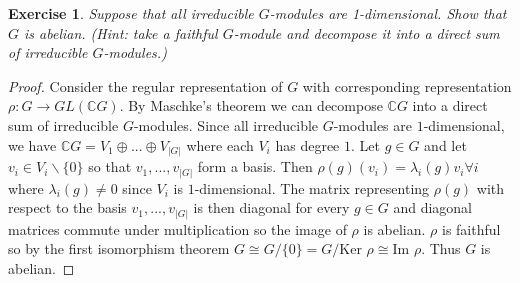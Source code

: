 \documentclass{article}
\newtheorem{exercise}[theorem]{Exercise}
\begin{document}
\begin{exercise} Suppose that all irreducible $G$-modules are 1-dimensional. Show that $G$ is abelian. (\textit{Hint: take a faithful $G$-module and decompose it into a direct sum of irreducible $G$-modules.})
\end{exercise}
\begin{proof}
Consider the regular representation of $G$ with corresponding representation $\rho:G\to GL(\mathbb{C}G)$. By Maschke's theorem we can decompose $\mathbb{C}G$ into a direct sum of irreducible $G$-modules. Since all irreducible $G$-modules are $1$-dimensional, we have $\mathbb{C}G=V_1\oplus...\oplus V_{|G|}$ where each $V_i$ has degree $1$. Let $g\in G$ and let $v_i\in V_i\backslash\{0\}$ so that $v_1,...,v_{|G|}$ form a basis. Then $\rho(g)(v_i)=\lambda_i(g)v_i\forall i$ where $\lambda_i(g)\neq 0$ since $V_i$ is $1$-dimensional. The matrix representing $\rho(g)$ with respect to the basis $v_1,...,v_{|G|}$ is then diagonal for every $g\in G$ and diagonal matrices commute under multiplication so the image of $\rho$ is abelian. $\rho$ is faithful so by the first isomorphism theorem $G\cong G/\{0\}=G/\text{Ker }\rho\cong\text{Im }\rho$. Thus $G$ is abelian.
\end{proof}
\end{document}
